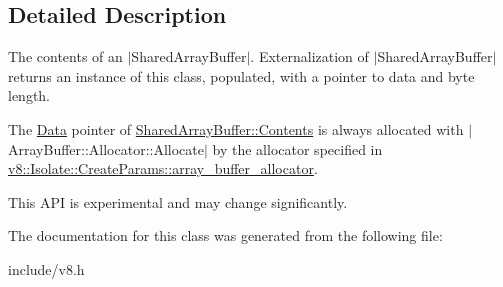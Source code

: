 \subsection{Detailed Description}
The contents of an $\vert$\+Shared\+Array\+Buffer$\vert$. Externalization of $\vert$\+Shared\+Array\+Buffer$\vert$ returns an instance of this class, populated, with a pointer to data and byte length.

The \hyperlink{classv8_1_1_data}{Data} pointer of \hyperlink{classv8_1_1_shared_array_buffer_1_1_contents}{Shared\+Array\+Buffer\+::\+Contents} is always allocated with $\vert$\+Array\+Buffer\+::\+Allocator\+::\+Allocate$\vert$ by the allocator specified in \hyperlink{structv8_1_1_isolate_1_1_create_params_a7c663f70b64290392eeaf164f57585f9}{v8\+::\+Isolate\+::\+Create\+Params\+::array\+\_\+buffer\+\_\+allocator}.

This A\+PI is experimental and may change significantly. 

The documentation for this class was generated from the following file\+:\begin{DoxyCompactItemize}
\item 
include/v8.\+h\end{DoxyCompactItemize}
